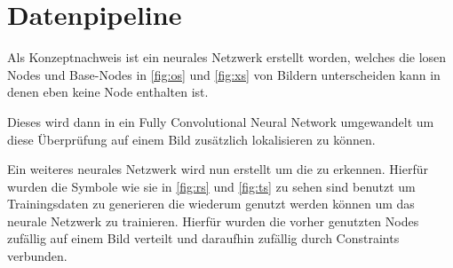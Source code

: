 \section{Datenpipeline}
Als Konzeptnachweis ist ein neurales Netzwerk erstellt worden, welches die losen Nodes und Base-Nodes in \ref{fig:os} und \ref{fig:xs} von Bildern unterscheiden kann in denen eben keine Node enthalten ist. 

Dieses wird dann in ein Fully Convolutional Neural Network\cite{Long2014} umgewandelt um diese Überprüfung auf einem Bild zusätzlich lokalisieren zu können.

Ein weiteres neurales Netzwerk wird nun erstellt um die  zu erkennen.
Hierfür wurden die Symbole wie sie in \ref{fig:rs} und \ref{fig:ts} zu sehen sind benutzt um Trainingsdaten zu generieren die wiederum genutzt werden können um das neurale Netzwerk zu trainieren.
Hierfür wurden die vorher genutzten Nodes zufällig auf einem Bild verteilt und daraufhin zufällig durch Constraints verbunden.


